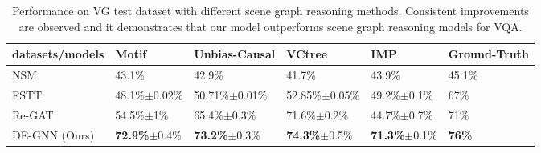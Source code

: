 \begin{table*}
\centering
    \begin{tabular}{llllll}
    \hline
    \textbf{datasets/models}&\textbf{Motif} & \textbf{Unbias-Causal}&\textbf{VCtree}&\textbf{IMP}&\textbf{Ground-Truth}\\
    \hline
     NSM \cite{DBLP:conf/nips/HudsonM19} &43.1\% &42.9\%& 41.7\% & 43.9\% & 45.1\%\\
     FSTT \cite{inproceedings} & 48.1\%$\pm$0.02\% & 50.71\%$\pm$0.01\% & 52.85\%$\pm$0.05\% & 49.2\%$\pm$0.1\% & 67\%\\
     Re-GAT \cite{DBLP:conf/iccv/LiGCL19} &54.5\%$\pm$1\% & 65.4\%$\pm$0.3\% & 71.6\%$\pm$0.2\% &44.7\%$\pm$0.7\% &71\%\\
     DE-GNN (Ours) & \textbf{72.9\%}$\pm$0.4\%& \textbf{73.2\%}$\pm$0.3\% & \textbf{74.3\%}$\pm$0.5\% & \textbf{71.3\%}$\pm$0.1\% &\textbf{76\%}\\
    \hline
    \end{tabular}
\caption{\label{citation-guide}
Performance on VG test dataset with different scene graph reasoning methods. Consistent improvements are observed and it demonstrates that our model outperforms scene graph reasoning models for VQA. 
}
\end{table*}